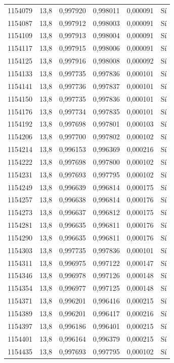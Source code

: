 \begin{longtable}{lccccc}
1154079 & 13,8 & 0,997920 & 0,998011 & 0,000091 & Sí \\
1154087 & 13,8 & 0,997912 & 0,998003 & 0,000091 & Sí \\
1154109 & 13,8 & 0,997913 & 0,998004 & 0,000091 & Sí \\
1154117 & 13,8 & 0,997915 & 0,998006 & 0,000091 & Sí \\
1154125 & 13,8 & 0,997916 & 0,998008 & 0,000092 & Sí \\
1154133 & 13,8 & 0,997735 & 0,997836 & 0,000101 & Sí \\
1154141 & 13,8 & 0,997736 & 0,997837 & 0,000101 & Sí \\
1154150 & 13,8 & 0,997735 & 0,997836 & 0,000101 & Sí \\
1154176 & 13,8 & 0,997734 & 0,997835 & 0,000101 & Sí \\
1154192 & 13,8 & 0,997698 & 0,997801 & 0,000103 & Sí \\
1154206 & 13,8 & 0,997700 & 0,997802 & 0,000102 & Sí \\
1154214 & 13,8 & 0,996153 & 0,996369 & 0,000216 & Sí \\
1154222 & 13,8 & 0,997698 & 0,997800 & 0,000102 & Sí \\
1154231 & 13,8 & 0,997693 & 0,997795 & 0,000102 & Sí \\
1154249 & 13,8 & 0,996639 & 0,996814 & 0,000175 & Sí \\
1154257 & 13,8 & 0,996638 & 0,996814 & 0,000176 & Sí \\
1154273 & 13,8 & 0,996637 & 0,996812 & 0,000175 & Sí \\
1154281 & 13,8 & 0,996635 & 0,996811 & 0,000176 & Sí \\
1154290 & 13,8 & 0,996635 & 0,996811 & 0,000176 & Sí \\
1154303 & 13,8 & 0,997735 & 0,997836 & 0,000101 & Sí \\
1154311 & 13,8 & 0,996975 & 0,997122 & 0,000147 & Sí \\
1154346 & 13,8 & 0,996978 & 0,997126 & 0,000148 & Sí \\
1154354 & 13,8 & 0,996977 & 0,997125 & 0,000148 & Sí \\
1154371 & 13,8 & 0,996201 & 0,996416 & 0,000215 & Sí \\
1154389 & 13,8 & 0,996201 & 0,996417 & 0,000216 & Sí \\
1154397 & 13,8 & 0,996186 & 0,996401 & 0,000215 & Sí \\
1154401 & 13,8 & 0,996164 & 0,996379 & 0,000215 & Sí \\
1154435 & 13,8 & 0,997693 & 0,997795 & 0,000102 & Sí \\

\end{longtable}
